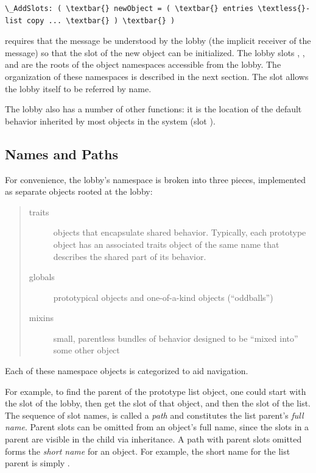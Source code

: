 \documentclass[letterpaper,10pt,english]{sphinxmanual}
\begin{document}
\begin{Verbatim}[commandchars=\\\{\}]
\_AddSlots: ( \textbar{} newObject = ( \textbar{} entries \textless{}- list copy ... \textbar{} ) \textbar{} )
\end{Verbatim}

requires that the message  be understood by the lobby (the implicit receiver of the message)
so that the  slot of the new object can be initialized. The lobby slots , ,
and  are the roots of the object namespaces accessible from the lobby. The organization of
these namespaces is described in the next section. The slot  allows the lobby itself to be referred
by name.

The lobby also has a number of other functions: it is the location of the default behavior inherited
by most objects in the system (slot ).


\subsection{Names and Paths}
\label{worldorg:names-and-paths}
For convenience, the lobby’s namespace is broken into three pieces, implemented as separate objects
rooted at the lobby:
\begin{quote}
\begin{description}
\item[{traits}] \leavevmode
objects that encapsulate shared behavior. Typically, each prototype object has an associated traits object of the same name that describes the shared part of its behavior.

\item[{globals}] \leavevmode
prototypical objects and one-of-a-kind objects (“oddballs”)

\item[{mixins}] \leavevmode
small, parentless bundles of behavior designed to be “mixed into” some other object

\end{description}
\end{quote}

Each of these namespace objects is categorized to aid navigation.

For example, to find the parent of the prototype list object, one could start with the  slot
of the lobby, then get the  slot of that object, and then the  slot of the list. The sequence
of slot names,  is called a \emph{path} and constitutes the list parent’s
\emph{full name}. Parent slots can be omitted from an object’s full name, since the slots in a parent are visible
in the child via inheritance. A path with parent slots omitted forms the \emph{short name} for an object.
For example, the short name for the list parent is simply .
\end{document}
